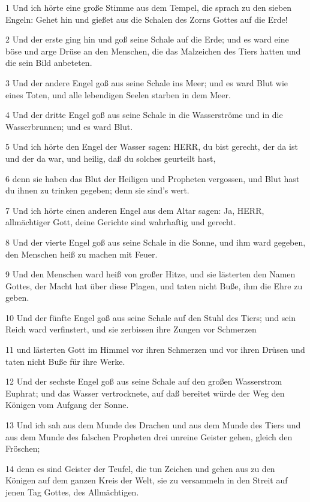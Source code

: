 \par 1 Und ich hörte eine große Stimme aus dem Tempel, die sprach zu den sieben Engeln: Gehet hin und gießet aus die Schalen des Zorns Gottes auf die Erde!
\par 2 Und der erste ging hin und goß seine Schale auf die Erde; und es ward eine böse und arge Drüse an den Menschen, die das Malzeichen des Tiers hatten und die sein Bild anbeteten.
\par 3 Und der andere Engel goß aus seine Schale ins Meer; und es ward Blut wie eines Toten, und alle lebendigen Seelen starben in dem Meer.
\par 4 Und der dritte Engel goß aus seine Schale in die Wasserströme und in die Wasserbrunnen; und es ward Blut.
\par 5 Und ich hörte den Engel der Wasser sagen: HERR, du bist gerecht, der da ist und der da war, und heilig, daß du solches geurteilt hast,
\par 6 denn sie haben das Blut der Heiligen und Propheten vergossen, und Blut hast du ihnen zu trinken gegeben; denn sie sind's wert.
\par 7 Und ich hörte einen anderen Engel aus dem Altar sagen: Ja, HERR, allmächtiger Gott, deine Gerichte sind wahrhaftig und gerecht.
\par 8 Und der vierte Engel goß aus seine Schale in die Sonne, und ihm ward gegeben, den Menschen heiß zu machen mit Feuer.
\par 9 Und den Menschen ward heiß von großer Hitze, und sie lästerten den Namen Gottes, der Macht hat über diese Plagen, und taten nicht Buße, ihm die Ehre zu geben.
\par 10 Und der fünfte Engel goß aus seine Schale auf den Stuhl des Tiers; und sein Reich ward verfinstert, und sie zerbissen ihre Zungen vor Schmerzen
\par 11 und lästerten Gott im Himmel vor ihren Schmerzen und vor ihren Drüsen und taten nicht Buße für ihre Werke.
\par 12 Und der sechste Engel goß aus seine Schale auf den großen Wasserstrom Euphrat; und das Wasser vertrocknete, auf daß bereitet würde der Weg den Königen vom Aufgang der Sonne.
\par 13 Und ich sah aus dem Munde des Drachen und aus dem Munde des Tiers und aus dem Munde des falschen Propheten drei unreine Geister gehen, gleich den Fröschen;
\par 14 denn es sind Geister der Teufel, die tun Zeichen und gehen aus zu den Königen auf dem ganzen Kreis der Welt, sie zu versammeln in den Streit auf jenen Tag Gottes, des Allmächtigen.
